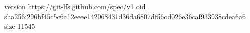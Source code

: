 version https://git-lfs.github.com/spec/v1
oid sha256:296bf45c5c6a12eeee142068431d36da6807df56cd026e36caf933938cdea6a6
size 11545
